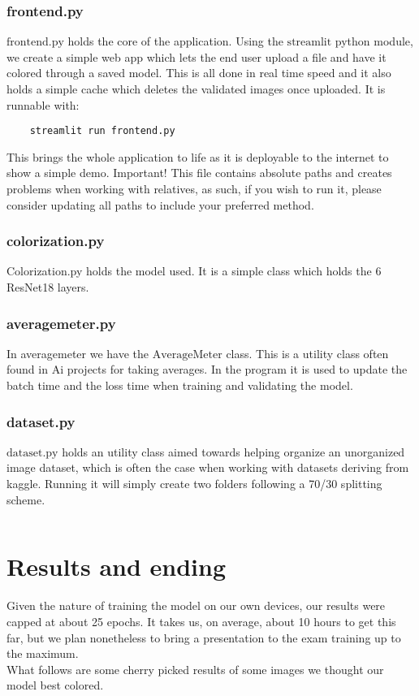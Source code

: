 \documentclass{article}
\begin{document}
\subsubsection{frontend.py}
$\text{frontend.py}$ holds the core of the application. Using the $\text{streamlit}$
python module, we create a simple web app which lets the end user upload a file and 
have it colored through a saved model. This is all done in real time speed and it also 
holds a simple cache which deletes the validated images once uploaded. It is runnable 
with: \\ 
\begin{verbatim}
    streamlit run frontend.py
\end{verbatim}
This brings the whole application to life as it is deployable to the internet to show a 
simple demo. 
Important! This file contains absolute paths and creates problems when working with 
relatives, as such, if you wish to run it, please consider updating all paths to 
include your preferred method. 

\subsubsection{colorization.py}
Colorization.py holds the model used. It is a simple class which holds the 6 ResNet18
layers. 

\subsubsection{averagemeter.py}
In averagemeter we have the $\text{AverageMeter}$ class. 
This is a utility class often found in Ai projects for taking 
averages. In the program it is used to update the batch time 
and the loss time when training and validating the model.

\subsubsection{dataset.py}
$\text{dataset.py}$ holds an utility class aimed towards helping organize an unorganized
image dataset, which is often the case when working with datasets deriving from 
kaggle. Running it will simply create two folders following a 70/30 splitting scheme.

\begin{verbatim}
\end{verbatim}

\section{Results and ending}
Given the nature of training the model on our own devices, our results were 
capped at about 25 epochs. It takes us, on average, about 10 hours to get this far,
but we plan nonetheless to bring a presentation to the exam training up to the maximum.
\\
What follows are some cherry picked results of some images we thought our model best 
colored. 
\end{document}
